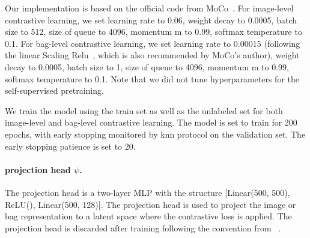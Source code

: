 Our implementation is based on the official code from MoCo~\citep{he2020momentum,chen2020improved}. For image-level contrastive learning, we set learning rate to 0.06, weight decay to 0.0005, batch size to 512, size of queue to 4096, momentum m to 0.99, softmax temperature to 0.1. For bag-level contrastive learning, we set learning rate to 0.00015 (following the linear Scaling Relu~\citep{goyal2017accurate}, which is also recommended by MoCo's author), weight decay to 0.0005, batch size to 1, size of queue to 4096, momentum m to 0.99, softmax temperature to 0.1. Note that we did not tune hyperparameters for the self-supervised pretraining. 

We train the model using the train set as well as the unlabeled set for both image-level and bag-level contrastive learning. The model is set to train for 200 epochs, with early stopping monitored by knn protocol on the validation set. The early stopping patience is set to 20.

\paragraph{projection head $\psi$.} The projection head is a two-layer MLP with the structure [Linear(500, 500), ReLU(), Linear(500, 128)]. The projection head is used to project the image or bag representation to a latent space where the contrastive loss is applied. The projection head is discarded after training following the convention from ~\citep{chen2020improved,chen2020simple}.